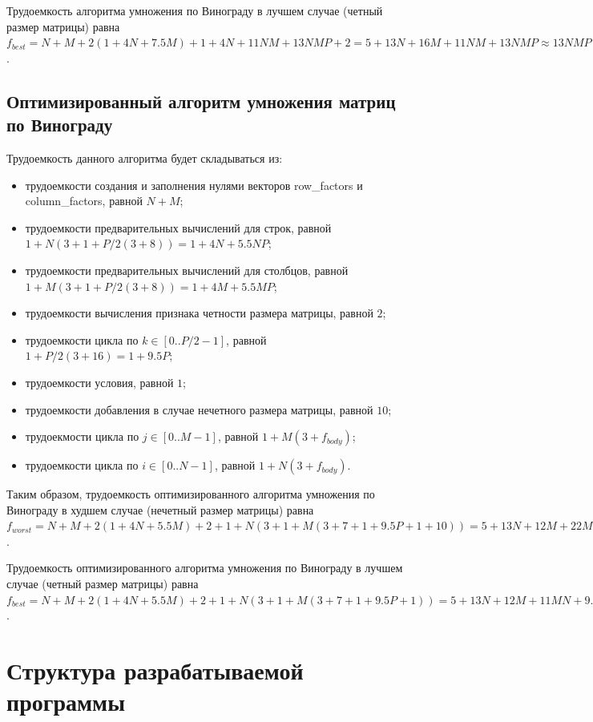 Трудоемкость алгоритма умножения по Винограду в лучшем случае (четный размер матрицы) равна $f_{best} = N + M + 2(1 + 4N + 7.5M) + 1 + 4N + 11NM + 13NMP + 2 = 5 + 13N + 16M + 11NM + 13NMP \approx 13NMP$.

\subsection{Оптимизированный алгоритм умножения матриц по Винограду}

Трудоемкость данного алгоритма будет складываться из:

\begin{itemize}
	\item трудоемкости создания и заполнения нулями векторов row\_factors и column\_factors, равной $N + M$;
	\item трудоемкости предварительных вычислений для строк, равной $1 + N(3 + 1 + P/2(3 + 8)) = 1 + 4N + 5.5NP$;
	\item трудоемкости предварительных вычислений для столбцов, равной $1 + M(3 + 1 + P/2(3 + 8)) = 1 + 4M + 5.5MP$;
	\item трудоемкости вычисления признака четности размера матрицы, равной $2$;
	\item трудоемкости цикла по $k \in [0..P/2-1]$, равной $1 + P/2(3 + 16) = 1 + 9.5P$;
	\item трудоемкости условия, равной $1$;
	\item трудоемкости добавления в случае нечетного размера матрицы, равной $10$;
	\item трудоекмости цикла по $j \in [0..M-1]$, равной $1 + M(3 + f_{body})$;
	\item трудоемкости цикла по $i \in [0..N-1]$, равной $1 + N(3 + f_{body})$.
\end{itemize}

Таким образом, трудоемкость оптимизированного алгоритма умножения по Винограду в худшем случае (нечетный размер матрицы) равна $f_{worst} = N + M + 2(1 + 4N + 5.5M) + 2 + 1 + N(3 + 1 + M(3 + 7 + 1 + 9.5P + 1 + 10)) = 5 + 13N + 12M + 22MN + 9.5MNP \approx 9.5NMP$.

Трудоемкость оптимизированного алгоритма умножения по Винограду в лучшем случае (четный размер матрицы) равна $f_{best} = N + M + 2(1 + 4N + 5.5M) + 2 + 1 + N(3 + 1 + M(3 + 7 + 1 + 9.5P + 1)) = 5 + 13N + 12M + 11MN + 9.5MNP \approx 9.5NMP$.


\section{Структура разрабатываемой программы}

